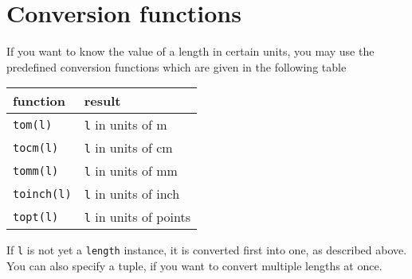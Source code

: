 \section{Conversion functions}
If you want to know the value of a \PyX{} length in certain units, you
may use the predefined conversion functions which are given in the
following table
\begin{center}
\begin{tabular}{ll}
function & result \\
\hline
\texttt{tom(l)} & \texttt{l} in units of m\\
\texttt{tocm(l)} & \texttt{l} in units of cm\\
\texttt{tomm(l)} & \texttt{l} in units of mm\\
\texttt{toinch(l)} & \texttt{l} in units of inch\\
\texttt{topt(l)} & \texttt{l} in units of points\\
\end{tabular}
\end{center}
If \verb|l| is not yet a \verb|length| instance, it is converted first
into one, as described above. You can also specify a tuple, if you
want to convert multiple lengths at once.








